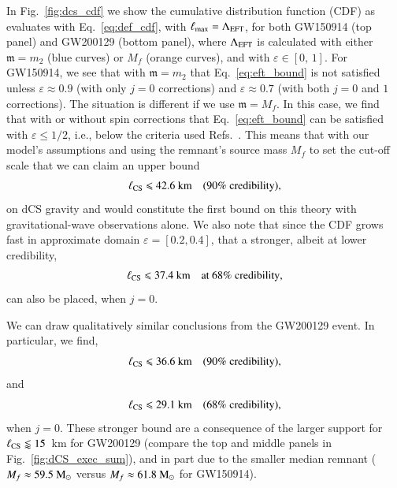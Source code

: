 \documentclass[twocolumn,prd,aps,superscriptaddress,preprintnumbers,tightenlines,showpacs,nofootinbib,amsfonts,amsmath,longbibliography]{revtex4-1}
\newcommand{\gm}{\mathfrak{m}}
\newcommand{\msun}{~{\rm M}_{\odot}}
\begin{document}
In Fig.~\ref{fig:dcs_cdf} we show the cumulative distribution function (CDF) as
evaluates with Eq.~\eqref{eq:def_cdf}, with $\ell_{\rm max} = \Lambda_{\rm EFT}$,
for both GW150914 (top panel) and GW200129 (bottom panel), where $\Lambda_{\rm EFT}$
is calculated with either $\mathfrak{m} = m_2$ (blue curves) or $M_{f}$ (orange curves),
and with $\varepsilon \in [0,\, 1]$.
%
For GW150914, we see that with $\gm = m_2$ that Eq.~\eqref{eq:eft_bound} is not
satisfied unless $\varepsilon \approx 0.9$ (with only $j=0$ corrections) and
$\varepsilon \approx 0.7$ (with both $j=0$ and $1$ corrections).
%
The situation is different if we use $\gm = M_f$. In this case, we find that
with or without spin corrections that Eq.~\eqref{eq:eft_bound} can be satisfied
with $\varepsilon \leqslant 1/2$, i.e., below the criteria used
Refs.~\cite{Nair:2019iur,Perkins:2021mhb,Lyu:2022gdr}.
%
This means that with our model's assumptions and using the remnant's source mass $M_f$ to set the
cut-off scale that we can claim an upper bound
%
\begin{equation}
\ell_{\rm CS} \leqslant 42.6~\textrm{km}
\quad \textrm{(90\% credibility)},
\end{equation}
%
on dCS gravity and would constitute the first bound on this theory with
gravitational-wave observations alone.
%
We also note that since the CDF grows fast in approximate domain $\varepsilon = [0.2, 0.4]$,
that a stronger, albeit at lower credibility,
%
\begin{equation}
\ell_{\rm CS} \leqslant 37.4~\textrm{km}
\quad \textrm{at 68\% credibility},
\end{equation}
%
can also be placed, when $j=0$.

We can draw qualitatively similar conclusions from the GW200129 event.
In particular, we find,
%
\begin{equation}
\ell_{\rm CS} \leqslant 36.6~\textrm{km}
\quad \textrm{(90\% credibility)},
\end{equation}
%
and
%
\begin{equation}
\ell_{\rm CS} \leqslant 29.1~\textrm{km}
\quad \textrm{(68\% credibility)},
\end{equation}
%
when $j=0$.
%
These stronger bound are a consequence of the larger support for $\ell_{\rm CS} \lessapprox 15$~km
for GW200129 (compare the top and middle panels in Fig.~\ref{fig:dCS_exec_sum}), and in part due to
the smaller median remnant ($M_{f} \approx 59.5\msun$ versus $M_{f} \approx 61.8\msun$ for GW150914).
\end{document}
